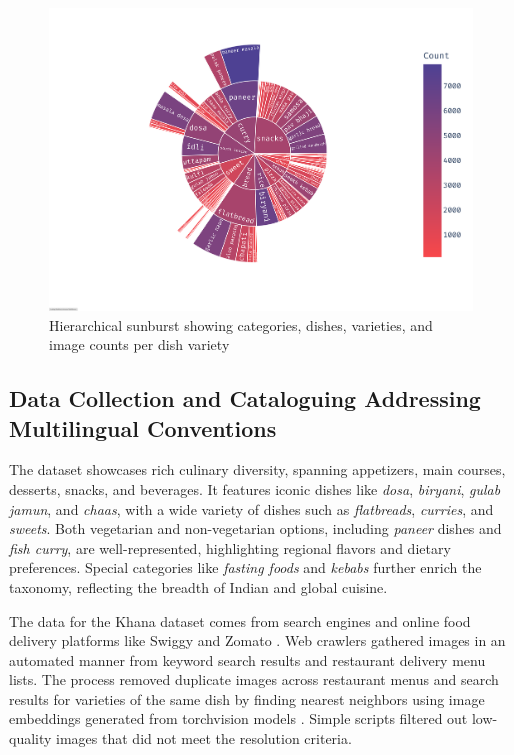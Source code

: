 \documentclass{article}
\begin{document}
\begin{figure}
	\centering
	\includegraphics[width=0.75\linewidth]{figs/sunburst.pdf}
	\caption{Hierarchical sunburst showing categories, dishes, varieties, and image counts per dish variety}
	\label{fig:sunburst}
\end{figure}

\subsection{Data Collection and Cataloguing Addressing Multilingual Conventions}
\label{subsec:data-collect-catal}

The dataset showcases rich culinary diversity, spanning appetizers, main courses, desserts, snacks, and beverages. It features iconic dishes like \textit{dosa}, \textit{biryani}, \textit{gulab jamun}, and \textit{chaas}, with a wide variety of dishes such as \textit{flatbreads}, \textit{curries}, and \textit{sweets}. Both vegetarian and non-vegetarian options, including \textit{paneer} dishes and \textit{fish curry}, are well-represented, highlighting regional flavors and dietary preferences. Special categories like \textit{fasting foods} and \textit{kebabs} further enrich the taxonomy, reflecting the breadth of Indian and global cuisine.

The data for the Khana dataset comes from search engines and online food delivery platforms like Swiggy and Zomato \cite{swimto}. Web crawlers gathered images in an automated manner from keyword search results and restaurant delivery menu lists. The process removed duplicate images across restaurant menus and search results for varieties of the same dish by finding nearest neighbors using image embeddings generated from torchvision models \cite{torchvision}. Simple scripts filtered out low-quality images that did not meet the resolution criteria.
\end{document}
